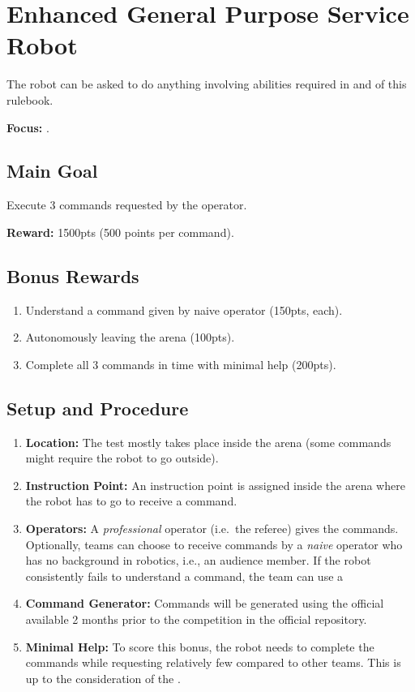 \section{Enhanced General Purpose Service Robot}
\label{test:egpsr}
The robot can be asked to do anything involving abilities required in \SONE{} and \STWO{} of this rulebook.

\noindent \textbf{Focus:} \SysI{}.

\subsection*{Main Goal}
Execute 3 commands requested by the operator.

\noindent\textbf{Reward:} 1500pts (500 points per command).

\subsection*{Bonus Rewards}
\begin{enumerate}[nosep]
	\item Understand a command given by naive operator (150pts, each).
	\item Autonomously leaving the arena (100pts).
	\item Complete all 3 commands in time with minimal help (200pts).
\end{enumerate}

%
%
\subsection*{Setup and Procedure}
\begin{enumerate}
	\item \textbf{Location:} The test mostly takes place inside the arena (some commands might require the robot to go outside).
	
	\item \textbf{Instruction Point:} An instruction point is assigned inside the arena where the robot has to go to receive a command.

	\item \textbf{Operators:} A \emph{professional} operator (i.e.~the referee) gives the commands. Optionally, teams can choose to receive commands by a \emph{naive} operator who has no background in robotics, i.e., an audience member. If the robot consistently fails to understand a command, the team can use a \CustomOperator{}

	\item \textbf{Command Generator:} Commands will be generated using the official \CommandGen{} available 2 months prior to the competition in the official repository\footnotemark {}.
	
	\item \textbf{Minimal Help:} To score this bonus, the robot needs to complete the commands while requesting relatively few  compared to other teams. This is up to the consideration of the .
\end{enumerate}

